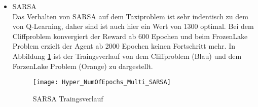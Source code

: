 \begin{itemize}
    \item SARSA\\
    Das Verhalten von SARSA auf dem Taxiproblem ist sehr indentisch zu dem von Q-Learning, daher sind ist auch hier ein Wert von 1300 optimal.
    Bei dem Cliffproblem konvergiert der Reward ab 600 Epochen und beim FrozenLake Problem erzielt der Agent ab 2000 Epochen keinen Fortschritt mehr.
    In Abbildung \ref{fig:SARSA_NumOfEpisods} ist der Traingsverlauf von dem Cliffproblem (Blau) und dem ForzenLake Problem (Orange) zu dargestellt.
    \begin{figure}[H]
      \centering
      \texttt{[image: Hyper\_NumOfEpochs\_Multi\_SARSA]}
      \caption{SARSA Traingsverlauf}
      \label{fig:SARSA_NumOfEpisods}
  \end{figure}
\end{itemize}

